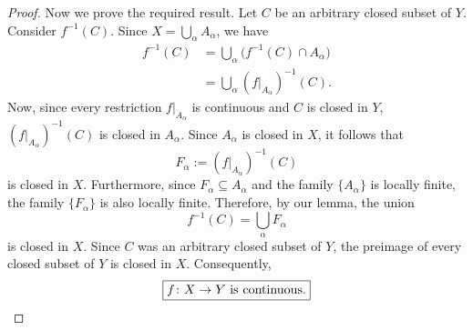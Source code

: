 \begin{proof}
Now we prove the required result. Let $C$ be an arbitrary closed subset of $Y$. Consider
$f^{-1}(C)$. Since $X=\bigcup_\alpha A_\alpha$, we have
\begin{align*}
  f^{-1}(C) &= \bigcup_\alpha\bigl(f^{-1}(C)\cap A_\alpha\bigr)\\
            &= \bigcup_\alpha(f|_{A_\alpha})^{-1}(C).
\end{align*}
Now, since every restriction $f|_{A_\alpha}$ is continuous and $C$ is closed in $Y$,
$(f|_{A_\alpha})^{-1}(C)$ is closed in $A_\alpha$. Since $A_\alpha$ is closed in $X$, it follows
that
\[ F_\alpha:=(f|_{A_\alpha})^{-1}(C) \]
is closed in $X$. Furthermore, since $F_\alpha\subseteq A_\alpha$ and the family $\{A_\alpha\}$
is locally finite, the family $\{F_\alpha\}$ is also locally finite. Therefore, by our lemma,
the union
\[ f^{-1}(C)=\bigcup_\alpha F_\alpha \]
is closed in $X$. Since $C$ was an arbitrary closed subset of $Y$, the preimage of every closed
subset of $Y$ is closed in $X$. Consequently,
\[ \boxed{f\colon X\to Y\text{ is continuous.}} \qedhere \]
\end{proof}

